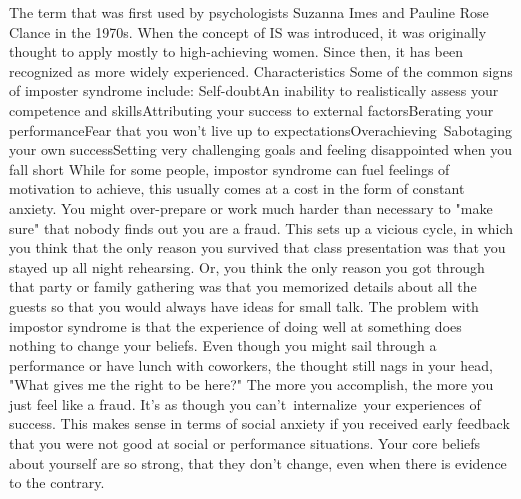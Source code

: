 \documentclass[14pt,a4paper]{extarticle}
\begin{document}
The term that was first used by psychologists Suzanna Imes and Pauline Rose Clance in the 1970s.﻿﻿ When the concept of IS was introduced, it was originally thought to apply mostly to high-achieving women. Since then, it has been recognized as more widely experienced.
\newline\newline  Characteristics \newline\newline 
Some of the common signs of imposter syndrome include:
\newline\newline 
Self-doubtAn inability to realistically assess your competence and skillsAttributing your success to external factorsBerating your performanceFear that you won't live up to expectationsOverachieving Sabotaging your own successSetting very challenging goals and feeling disappointed when you fall short
\newline\newline 
While for some people, impostor syndrome can fuel feelings of motivation to achieve, this usually comes at a cost in the form of constant anxiety. You might over-prepare or work much harder than necessary to "make sure" that nobody finds out you are a fraud.
\newline\newline 
This sets up a vicious cycle, in which you think that the only reason you survived that class presentation was that you stayed up all night rehearsing. Or, you think the only reason you got through that party or family gathering was that you memorized details about all the guests so that you would always have ideas for small talk.
\newline\newline 
The problem with impostor syndrome is that the experience of doing well at something does nothing to change your beliefs. Even though you might sail through a performance or have lunch with coworkers, the thought still nags in your head, "What gives me the right to be here?" The more you accomplish, the more you just feel like a fraud. It's as though you can't internalize your experiences of success.
\newline\newline 
This makes sense in terms of social anxiety if you received early feedback that you were not good at social or performance situations. Your core beliefs about yourself are so strong, that they don't change, even when there is evidence to the contrary.
\newline\newline 
\end{document}
